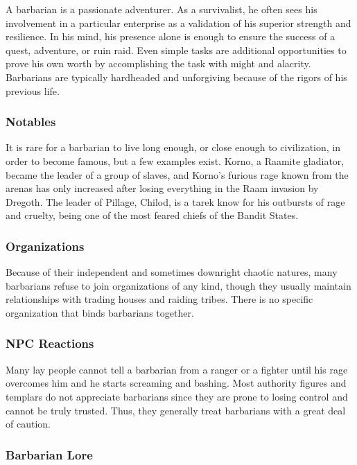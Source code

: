 \documentclass[10pt,a4paper,twocolumn]{d20}
\begin{document}
{A barbarian is a passionate adventurer. As a survivalist, he often sees his involvement in a particular enterprise as a validation of his superior strength and resilience. In his mind, his presence alone is enough to ensure the success of a quest, adventure, or ruin raid. Even simple tasks are additional opportunities to prove his own worth by accomplishing the task with might and alacrity. Barbarians are typically hardheaded and unforgiving because of the rigors of his previous life.

\subsubsection{Notables}

It is rare for a barbarian to live long enough, or close enough to civilization, in order to become famous, but a few examples exist. Korno, a Raamite gladiator, became the leader of a group of slaves, and Korno’s furious rage known from the arenas has only increased after losing everything in the Raam invasion by Dregoth. The leader of Pillage, Chilod, is a tarek know for his outbursts of rage and cruelty, being one of the most feared chiefs of the Bandit States.

\subsubsection{Organizations}

Because of their independent and sometimes downright chaotic natures, many barbarians refuse to join organizations of any kind, though they usually maintain relationships with trading houses and raiding tribes. There is no specific organization that binds barbarians together.

\subsubsection{NPC Reactions}

Many lay people cannot tell a barbarian from a ranger or a fighter until his rage overcomes him and he starts screaming and bashing. Most authority figures and templars do not appreciate barbarians since they are prone to losing control and cannot be truly trusted. Thus, they generally treat barbarians with a great deal of caution.

\subsubsection{Barbarian Lore}

}
\end{document}
